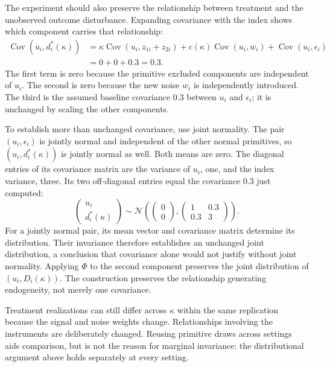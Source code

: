 The experiment should also preserve the relationship between treatment and the unobserved outcome disturbance. Expanding covariance with the index shows which component carries that relationship:
\[
 \begin{aligned}
 \operatorname{Cov}(u_i,d_i^*(\kappa))
 &=\kappa\operatorname{Cov}(u_i,z_{1i}+z_{2i})
   +c(\kappa)\operatorname{Cov}(u_i,w_i)
   +\operatorname{Cov}(u_i,\epsilon_i)\\
 &=0+0+0.3=0.3.
 \end{aligned}
\]
The first term is zero because the primitive excluded components are independent of $u_i$. The second is zero because the new noise $w_i$ is independently introduced. The third is the assumed baseline covariance 0.3 between $u_i$ and $\epsilon_i$; it is unchanged by scaling the other components.

To establish more than unchanged covariance, use joint normality. The pair $(u_i,\epsilon_i)$ is jointly normal and independent of the other normal primitives, so $(u_i,d_i^*(\kappa))$ is jointly normal as well. Both means are zero. The diagonal entries of its covariance matrix are the variance of $u_i$, one, and the index variance, three. Its two off-diagonal entries equal the covariance 0.3 just computed:
\begin{equation}
 \begin{pmatrix}u_i\\d_i^*(\kappa)\end{pmatrix}
 \sim\mathcal{N}\!\left(
 \begin{pmatrix}0\\0\end{pmatrix},
 \begin{pmatrix}1&0.3\\0.3&3\end{pmatrix}\right).
 \label{eq:appendix-endogeneity-invariance}
\end{equation}
For a jointly normal pair, its mean vector and covariance matrix determine its distribution. Their invariance therefore establishes an unchanged joint distribution, a conclusion that covariance alone would not justify without joint normality. Applying $\Phi$ to the second component preserves the joint distribution of $(u_i,D_i(\kappa))$. The construction preserves the relationship generating endogeneity, not merely one covariance.

Treatment realizations can still differ across $\kappa$ within the same replication because the signal and noise weights change. Relationships involving the instruments are deliberately changed. Reusing primitive draws across settings aids comparison, but is not the reason for marginal invariance: the distributional argument above holds separately at every setting.


